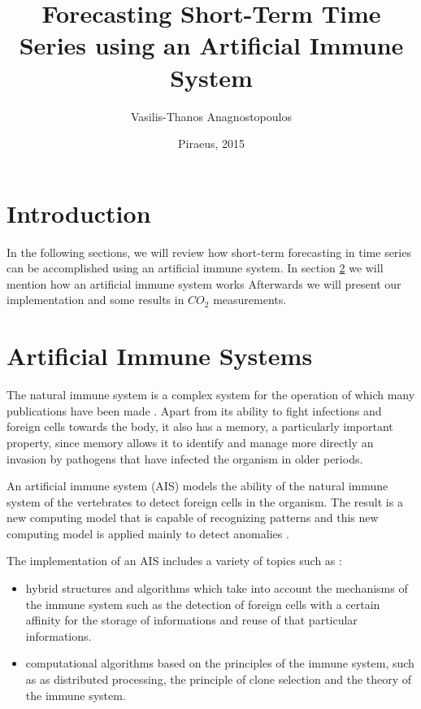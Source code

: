 \documentclass{assignment}
\title{Forecasting Short-Term Time Series using an Artificial Immune System }
\date{Piraeus, 2015}
\author{Vasilis-Thanos Anagnostopoulos}
\begin{document}
\maketitle

\setcounter{page}{1} 

\pagestyle{plain}
\tableofcontents
\listoftables
\listoffigures
\listofalgorithms
\newpage

\setcounter{page}{1} 

\section{Introduction}

In the following sections, we will review how short-term forecasting in time series can be accomplished using an artificial immune system. In section \ref{ais} we will mention how an artificial immune system works %
Afterwards we will present our implementation and some results in $CO_2$ measurements.

\section{Artificial Immune Systems}
\label{ais}

The natural immune system is a complex system for the operation of which many publications have been made \cite{wiki:immune_system}. Apart from its ability to fight infections and foreign cells towards the body, it also has a memory, a particularly important property, since memory allows it to identify and manage more directly an invasion by pathogens that have infected the organism in older periods. 

An artificial immune system (AIS) models the ability of the natural immune system of the vertebrates to detect foreign cells in the organism. The result is a new computing model that is capable of recognizing patterns and this new computing model is applied mainly to detect anomalies \cite{engelbrecht,wiki:artificial_immune_system}.

The implementation of an AIS includes a variety of topics such as \cite{engelbrecht,karakasis_thesis}:

\begin{itemize}
\item hybrid structures and algorithms which take into account the mechanisms of the immune system such as the detection of foreign cells with a certain affinity for the storage of informations and reuse of that particular informations.
\item computational algorithms based on the principles of the immune system, such as as distributed processing, the principle of clone selection and the theory of the immune system.
\end{itemize}
\end{document}
